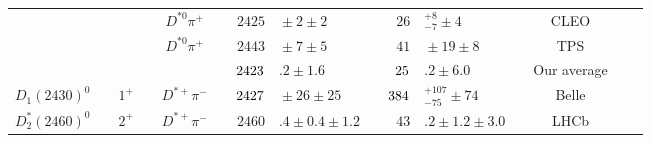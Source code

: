 \begin{adjustbox}{width=0.76\textwidth,center}
{\begin{tabular}{cp{5pt}cp{5pt}cp{5pt}r@{}lp{5pt}r@{}lp{5pt}cp{5pt}c}
		                                         &                  &                              &                  & $D^{*0}\pi^{+}$                 &                       & $	2425$                       & ${}\pm2\pm2	$                                 &                       & $	26$                                            & ${}^{+8}_{-7}\pm4	$                          &                       & CLEO                                                          &                       & \cite{Bergfeld:1994af}                    \\
		                                         &                  &                              &                  & $D^{*0}\pi^{+}$                 &                       & $	2443$                       & ${} \pm7\pm5	$                                &                       & $	41$                                            & ${}\pm19\pm8	$                               &                       & TPS                                                           &                       & \cite{Anjos:1988uf}                       \\ \cmidrule{6-14}
		                                         &                  &                              &                  &                                 & \cellcolor{Gray}      & $	\cellcolor{Gray} 2423$      & \cellcolor{Gray}$.2 \pm 1.6	$\cellcolor{Gray} & \cellcolor{Gray}      & $	\cellcolor{Gray} 25$                           & \cellcolor{Gray}$.2 \pm 6.0	$                & \cellcolor{Gray}      & \cellcolor{Gray} Our average                                  & \cellcolor{Gray}      &                                           \\ \midrule
		\multirow{1}{*}{$D_{1}(2430)^{0}$}       &                  & \multirow{1}{*}{$1^{+}$}     &                  & $D^{*+}\pi^{-}$                 & \cellcolor{LightGray} & $	\cellcolor{LightGray}2427$  & \cellcolor{LightGray}${}\pm26\pm25	$          & \cellcolor{LightGray} & $	\cellcolor{LightGray} 384$                     & \cellcolor{LightGray}${}^{+107}_{-75}\pm74	$ & \cellcolor{LightGray} & \cellcolor{LightGray} Belle                                   & \cellcolor{LightGray} & \cite{Abe:2003zm}                         \\ \midrule
		\multirow{14}{*}{$D_{2}^{*}(2460)^{0}$}  &                  & \multirow{14}{*}{$2^{+}$}    &                  & $D^{*+}\pi^{-}$                 &                       & $	2460$                       & $.4\pm0.4\pm1.2	$                             &                       & $	43$                                            & $.2\pm1.2\pm3.0	$                            &                       & LHCb                                                          &                       & \cite{Aaij:2013sza}                       \\

\end{tabular}}
\end{adjustbox}
